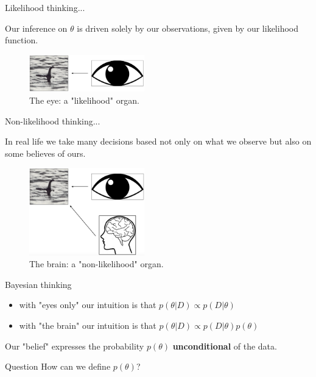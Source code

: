 \begin{frame}{Likelihood thinking...}

	Our inference on $\theta$ is driven solely by our observations, given by our likelihood function.

	\begin{figure}[!ht]
		\centering
		\includegraphics[width=5cm]{Images/EyeOnly.png}
		\caption{The eye: a "likelihood" organ.}
		\label{Fig:EyeOnly}
	\end{figure}

\end{frame}

\begin{frame}{Non-likelihood thinking...}

	In real life we take many decisions based not only on what we observe but also on some believes of ours.

	\begin{figure}[!ht]
		\centering
		\includegraphics[width=5cm]{Images/EyeBrain.png}
		\caption{The brain: a "non-likelihood" organ.}
		\label{Fig:EyeBrain}
	\end{figure}

\end{frame}

\begin{frame}{Bayesian thinking}

	\begin{itemize}
		\item with "eyes only" our intuition is that $p(\theta|D) \propto p(D|\theta)$
		\item with "the brain" our intuition is that $p(\theta|D) \propto p(D|\theta)p(\theta)$
	\end{itemize}

	Our "belief" expresses the probability $p(\theta)$ \textbf{unconditional} of the data.

	\begin{block}{Question}
		How can we define $p(\theta)$?
	\end{block}

\end{frame}

